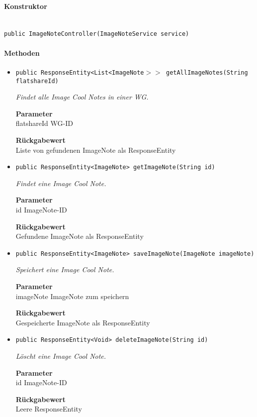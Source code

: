     \paragraph*{Konstruktor}\mbox{} \\
    \texttt{public ImageNoteController(ImageNoteService service)} \\
    \paragraph*{Methoden}
    \begin{itemize}
    	\item{\texttt{public ResponseEntity<List<ImageNote$>>$ getAllImageNotes(String flatshareId)}}
    	
    	\textit{Findet alle Image Cool Notes in einer WG.}
    	
    	\textbf{Parameter} \\
    	flatshareId WG-ID
    	
    	\textbf{Rückgabewert} \\
    	Liste von gefundenen ImageNote als ResponseEntity        \item{\texttt{public ResponseEntity<ImageNote> getImageNote(String id)}}
    	
    	\textit{Findet eine Image Cool Note.}
    	
    	\textbf{Parameter} \\
    	id ImageNote-ID
    	
    	\textbf{Rückgabewert} \\
    	Gefundene ImageNote als ResponseEntity        \item{\texttt{public ResponseEntity<ImageNote> saveImageNote(ImageNote imageNote)}}
    	
    	\textit{Speichert eine Image Cool Note.}
    	
    	\textbf{Parameter} \\
    	imageNote ImageNote zum speichern
    	
    	\textbf{Rückgabewert} \\
    	Gespeicherte ImageNote als ResponseEntity        \item{\texttt{public ResponseEntity<Void> deleteImageNote(String id)}}
    	
    	\textit{Löscht eine Image Cool Note.}
    	
    	\textbf{Parameter} \\
    	id ImageNote-ID
    	
    	\textbf{Rückgabewert} \\
    	Leere ResponseEntity
    \end{itemize}
